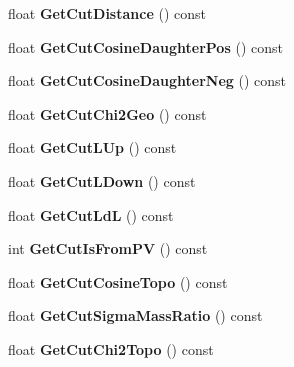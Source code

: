 \begin{DoxyCompactItemize}
\item 
float {\bfseries Get\+Cut\+Distance} () const \hypertarget{classCutsContainer_a780e0b669d0bf54e4b7fd6db48140d6a}{}\label{classCutsContainer_a780e0b669d0bf54e4b7fd6db48140d6a}

\item 
float {\bfseries Get\+Cut\+Cosine\+Daughter\+Pos} () const \hypertarget{classCutsContainer_a88cfd80d55a38562b534b7b461c64b3d}{}\label{classCutsContainer_a88cfd80d55a38562b534b7b461c64b3d}

\item 
float {\bfseries Get\+Cut\+Cosine\+Daughter\+Neg} () const \hypertarget{classCutsContainer_ab502d98918b4ffbc4ce2b7eb7c08ea4b}{}\label{classCutsContainer_ab502d98918b4ffbc4ce2b7eb7c08ea4b}

\item 
float {\bfseries Get\+Cut\+Chi2\+Geo} () const \hypertarget{classCutsContainer_ad9f7306614d61861aa9047c2cbcf906e}{}\label{classCutsContainer_ad9f7306614d61861aa9047c2cbcf906e}

\item 
float {\bfseries Get\+Cut\+L\+Up} () const \hypertarget{classCutsContainer_aaac5e707c7ca72b5718cfd5938013569}{}\label{classCutsContainer_aaac5e707c7ca72b5718cfd5938013569}

\item 
float {\bfseries Get\+Cut\+L\+Down} () const \hypertarget{classCutsContainer_a8902216d9154ebcdb603369305c4cced}{}\label{classCutsContainer_a8902216d9154ebcdb603369305c4cced}

\item 
float {\bfseries Get\+Cut\+LdL} () const \hypertarget{classCutsContainer_a1017994057aada0ddd428ccb1b996b79}{}\label{classCutsContainer_a1017994057aada0ddd428ccb1b996b79}

\item 
int {\bfseries Get\+Cut\+Is\+From\+PV} () const \hypertarget{classCutsContainer_a34042ca8eccc8fbe9b5e59002d6539ed}{}\label{classCutsContainer_a34042ca8eccc8fbe9b5e59002d6539ed}

\item 
float {\bfseries Get\+Cut\+Cosine\+Topo} () const \hypertarget{classCutsContainer_a9ce2aa6b334076f14227c46ea714f724}{}\label{classCutsContainer_a9ce2aa6b334076f14227c46ea714f724}

\item 
float {\bfseries Get\+Cut\+Sigma\+Mass\+Ratio} () const \hypertarget{classCutsContainer_a6bc52fe037fb553913a7a6ab6b4b8d51}{}\label{classCutsContainer_a6bc52fe037fb553913a7a6ab6b4b8d51}

\item 
float {\bfseries Get\+Cut\+Chi2\+Topo} () const \hypertarget{classCutsContainer_a99078827eef8d5dd862aa0e50b51ed62}{}\label{classCutsContainer_a99078827eef8d5dd862aa0e50b51ed62}

\end{DoxyCompactItemize}
